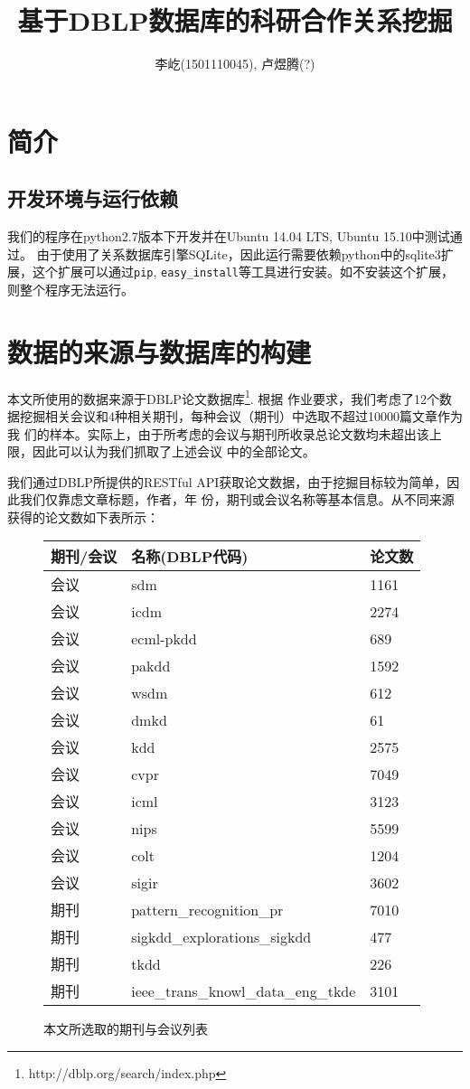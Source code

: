 \documentclass[a4paper]{article}
\title{基于DBLP数据库的科研合作关系挖掘}
\author{李屹(1501110045), 卢煜腾(?)}
\begin{document}
\maketitle

\section{简介}
\subsection{开发环境与运行依赖}
我们的程序在python2.7版本下开发并在Ubuntu 14.04 LTS, Ubuntu 15.10中测试通过。
由于使用了关系数据库引擎SQLite，因此运行需要依赖python中的sqlite3扩展，这个扩展可以通过\texttt{pip},
\texttt{easy\_install}等工具进行安装。如不安装这个扩展，则整个程序无法运行。

\section{数据的来源与数据库的构建}
本文所使用的数据来源于DBLP论文数据库\footnote{http://dblp.org/search/index.php}. 根据
作业要求，我们考虑了12个数据挖掘相关会议和4种相关期刊，每种会议（期刊）中选取不超过10000篇文章作为我
们的样本。实际上，由于所考虑的会议与期刊所收录总论文数均未超出该上限，因此可以认为我们抓取了上述会议
中的全部论文。

我们通过DBLP所提供的RESTful API获取论文数据，由于挖掘目标较为简单，因此我们仅靠虑文章标题，作者，年
份，期刊或会议名称等基本信息。从不同来源获得的论文数如下表所示：

\begin{figure}[ht]
  \centering
  \begin{tabular}{lll}
    \hline
    期刊/会议 & 名称(DBLP代码) & 论文数 \\
    \hline
    会议 & sdm & 1161\\
    会议 & icdm & 2274\\
    会议 & ecml-pkdd & 689\\
    会议 & pakdd & 1592\\
    会议 & wsdm & 612\\
    会议 & dmkd & 61\\
    会议 & kdd & 2575\\
    会议 & cvpr & 7049\\
    会议 & icml & 3123\\
    会议 & nips & 5599\\
    会议 & colt & 1204\\
    会议 & sigir & 3602\\
    期刊 & pattern\_recognition\_pr & 7010\\
    期刊 & sigkdd\_explorations\_sigkdd & 477\\
    期刊 & tkdd & 226\\
    期刊 & ieee\_trans\_knowl\_data\_eng\_tkde & 3101\\
    \hline
  \end{tabular}
  \label{table:dataset}
  \caption{本文所选取的期刊与会议列表}
\end{figure}
\end{document}
